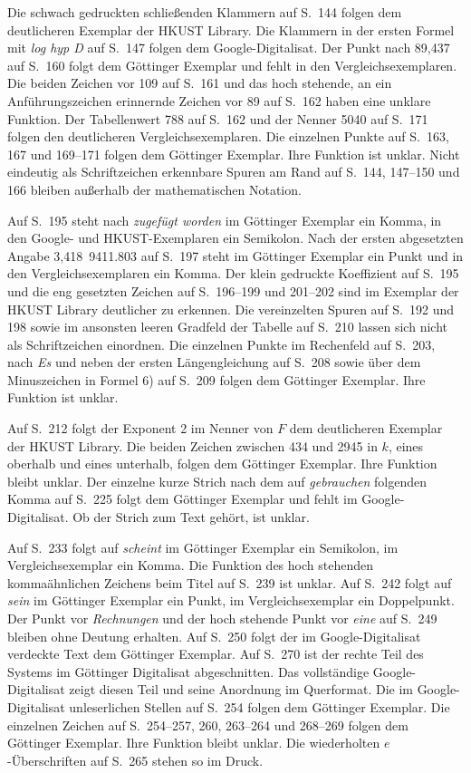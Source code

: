 Die schwach gedruckten schließenden Klammern auf S.~144 folgen dem
deutlicheren Exemplar der HKUST Library. Die Klammern in der ersten
Formel mit \emph{log hyp D} auf S.~147 folgen dem Google-Digitalisat.
Der Punkt nach 89,437 auf S.~160 folgt dem Göttinger Exemplar und
fehlt in den Vergleichsexemplaren. Die beiden Zeichen vor 109 auf
S.~161 und das hoch stehende, an ein Anführungszeichen erinnernde
Zeichen vor 89 auf S.~162 haben eine unklare Funktion. Der Tabellenwert
788 auf S.~162 und der Nenner 5040 auf S.~171 folgen den deutlicheren
Vergleichsexemplaren. Die einzelnen Punkte auf S.~163, 167 und
169--171 folgen dem Göttinger Exemplar. Ihre Funktion ist unklar.
Nicht eindeutig als Schriftzeichen erkennbare Spuren am Rand auf
S.~144, 147--150 und 166 bleiben außerhalb der mathematischen
Notation.

Auf S.~195 steht nach \emph{zugefügt worden} im Göttinger Exemplar
ein Komma, in den Google- und HKUST-Exemplaren ein Semikolon. Nach
der ersten abgesetzten Angabe \mbox{3,418 9411.803} auf S.~197 steht
im Göttinger Exemplar ein Punkt und in den Vergleichsexemplaren ein
Komma. Der klein gedruckte Koeffizient auf S.~195 und die eng gesetzten
Zeichen auf S.~196--199 und 201--202 sind im Exemplar der HKUST
Library deutlicher zu erkennen. Die vereinzelten Spuren auf S.~192
und 198 sowie im ansonsten leeren Gradfeld der Tabelle auf
S.~210 lassen sich nicht als Schriftzeichen einordnen. Die einzelnen
Punkte im Rechenfeld auf S.~203, nach \emph{Es} und neben der ersten
Längengleichung auf S.~208 sowie über dem Minuszeichen in Formel 6)
auf S.~209 folgen dem Göttinger Exemplar. Ihre Funktion ist unklar.

Auf S.~212 folgt der Exponent 2 im Nenner von \(F\) dem deutlicheren
Exemplar der HKUST Library. Die beiden Zeichen zwischen 434 und
2945 in \(k\), eines oberhalb und eines unterhalb, folgen dem
Göttinger Exemplar. Ihre Funktion bleibt unklar. Der einzelne kurze
Strich nach dem auf \emph{gebrauchen} folgenden Komma auf S.~225
folgt dem Göttinger Exemplar und fehlt im Google-Digitalisat. Ob
der Strich zum Text gehört, ist unklar.

Auf S.~233 folgt auf \emph{scheint} im Göttinger Exemplar ein
Semikolon, im Vergleichsexemplar ein Komma. Die Funktion des hoch
stehenden kommaähnlichen Zeichens beim Titel auf S.~239 ist
unklar. Auf S.~242 folgt auf \emph{sein} im Göttinger Exemplar ein
Punkt, im Vergleichsexemplar ein Doppelpunkt. Der Punkt vor
\emph{Rechnungen} und der hoch stehende Punkt vor \emph{eine} auf
S.~249 bleiben ohne Deutung erhalten. Auf S.~250 folgt der im
Google-Digitalisat verdeckte Text dem Göttinger Exemplar. Auf
S.~270 ist der rechte Teil des Systems im Göttinger Digitalisat
abgeschnitten. Das vollständige Google-Digitalisat zeigt diesen
Teil und seine Anordnung im Querformat. Die im Google-Digitalisat
unleserlichen Stellen auf S.~254 folgen dem Göttinger Exemplar.
Die einzelnen Zeichen auf S.~254--257, 260, 263--264 und 268--269
folgen dem Göttinger Exemplar. Ihre Funktion bleibt unklar. Die
wiederholten \(e\)-Überschriften auf S.~265 stehen so im Druck.

